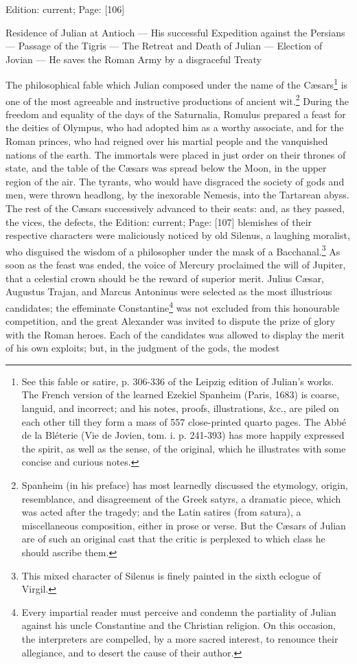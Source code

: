Edition: current; Page: [106]


Residence of Julian at Antioch \texthebrew{—} His successful Expedition against the Persians \texthebrew{—} Passage of the Tigris \texthebrew{—} The Retreat and Death of Julian \texthebrew{—} Election of Jovian \texthebrew{—} He saves the Roman Army by a disgraceful Treaty

The philosophical fable which Julian composed under the name of the Cæsars\footnote{See this fable or satire, p. 306-336 of the Leipzig edition of Julian\texthebrew{}’s works. The French version of the learned Ezekiel Spanheim (Paris, 1683) is coarse, languid, and incorrect; and his notes, proofs, illustrations, \&c., are piled on each other till they form a mass of 557 close-printed quarto pages. The Abbé de la Bléterie (Vie de Jovien, tom. i. p. 241-393) has more happily expressed the spirit, as well as the sense, of the original, which he illustrates with some concise and curious notes.} is one of the most agreeable and instructive productions of ancient wit.\footnote{Spanheim (in his preface) has most learnedly discussed the etymology, origin, resemblance, and disagreement of the Greek satyrs, a dramatic piece, which was acted after the tragedy; and the Latin satires (from satura), a miscellaneous composition, either in prose or verse. But the Cæsars of Julian are of such an original cast that the critic is perplexed to which class he should ascribe them.} During the freedom and equality of the days of the Saturnalia, Romulus prepared a feast for the deities of Olympus, who had adopted him as a worthy associate, and for the Roman princes, who had reigned over his martial people and the vanquished nations of the earth. The immortals were placed in just order on their thrones of state, and the table of the Cæsars was spread below the Moon, in the upper region of the air. The tyrants, who would have disgraced the society of gods and men, were thrown headlong, by the inexorable Nemesis, into the Tartarean abyss. The rest of the Cæsars successively advanced to their seats: and, as they passed, the vices, the defects, the Edition: current; Page: [107] blemishes of their respective characters were maliciously noticed by old Silenus, a laughing moralist, who disguised the wisdom of a philosopher under the mask of a Bacchanal.\footnote{This mixed character of Silenus is finely painted in the sixth eclogue of Virgil.} As soon as the feast was ended, the voice of Mercury proclaimed the will of Jupiter, that a celestial crown should be the reward of superior merit. Julius Cæsar, Augustus Trajan, and Marcus Antoninus were selected as the most illustrious candidates; the effeminate Constantine\footnote{Every impartial reader must perceive and condemn the partiality of Julian against his uncle Constantine and the Christian religion. On this occasion, the interpreters are compelled, by a more sacred interest, to renounce their allegiance, and to desert the cause of their author.} was not excluded from this honourable competition, and the great Alexander was invited to dispute the prize of glory with the Roman heroes. Each of the candidates was allowed to display the merit of his own exploits; but, in the judgment of the gods, the modest 